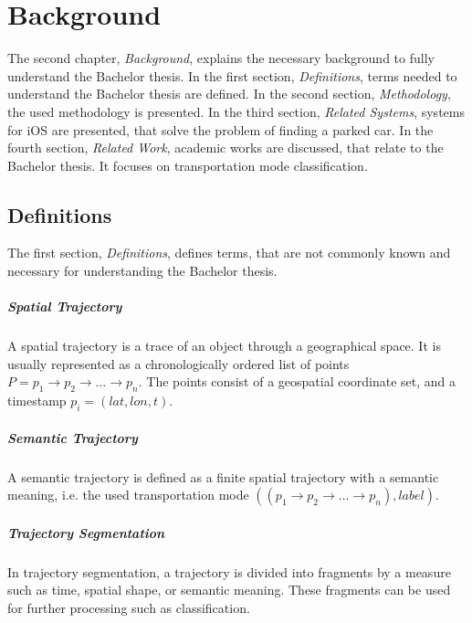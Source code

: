 \chapter{Background}
The second chapter, \textit{Background}, explains the necessary background to fully understand the Bachelor thesis. 
In the first section, \textit{Definitions}, terms needed to understand the Bachelor thesis are defined.
In the second section, \textit{Methodology}, the used methodology is presented.
In the third section, \textit{Related Systems}, systems for iOS are presented, that solve the problem of finding a parked car.
In the fourth section, \textit{Related Work}, academic works are discussed, that relate to the Bachelor thesis. It focuses on transportation mode classification.

\section{Definitions}

The first section, \textit{Definitions}, defines terms, that are not commonly known and necessary for understanding the Bachelor thesis. 

\paragraph{Spatial Trajectory} A spatial trajectory is a trace of an object through a geographical space. It is usually represented as a chronologically ordered list of points $ P = p_1\rightarrow p_2 \rightarrow \dots \rightarrow p_n$. The points consist of a geospatial coordinate set, and a timestamp $p_i=(lat,lon,t)$. \cite{Zheng:2015:TDM:2764959.2743025}

\paragraph{Semantic Trajectory} A semantic trajectory is defined as a finite spatial trajectory with a semantic meaning, i.e. the used transportation mode $((p_1\rightarrow p_2 \rightarrow \dots \rightarrow p_n), label)$. \cite{Zheng:2015:TDM:2764959.2743025}

\paragraph{Trajectory Segmentation} In trajectory segmentation, a trajectory is divided into fragments by a measure such as time, spatial shape, or semantic meaning. These fragments can be used for further processing such as classification. \cite{Zheng:2015:TDM:2764959.2743025}

